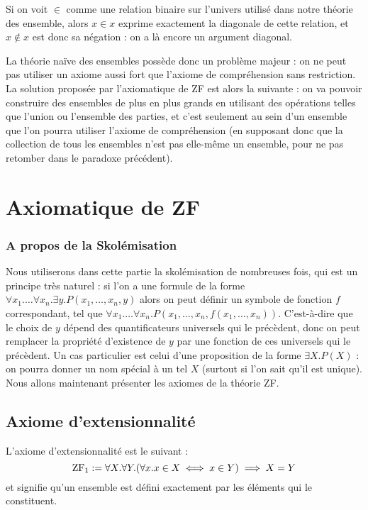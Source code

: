 \begin{rmk}
    Si on voit $\in$ comme une relation binaire sur l'univers utilisé dans notre théorie des ensemble, alors $x\in x$ exprime exactement la diagonale de cette relation, et $x\notin x$ est donc sa négation : on a là encore un argument diagonal.
\end{rmk}

La théorie naïve des ensembles possède donc un problème majeur : on ne peut pas utiliser un axiome aussi fort que l'axiome de compréhension sans restriction. La solution proposée par l'axiomatique de ZF est alors la suivante : on va pouvoir construire des ensembles de plus en plus grands en utilisant des opérations telles que l'union ou l'ensemble des parties, et c'est seulement au sein d'un ensemble que l'on pourra utiliser l'axiome de compréhension (en supposant donc que la collection de tous les ensembles n'est pas elle-même un ensemble, pour ne pas retomber dans le paradoxe précédent).

\section{Axiomatique de ZF}

\subsubsection{A propos de la Skolémisation}

Nous utiliserons dans cette partie la skolémisation de nombreuses fois, qui est un principe très naturel : si l'on a une formule de la forme $\forall x_1.\ldots\forall x_n.\exists y. P(x_1,\ldots,x_n,y)$ alors on peut définir un symbole de fonction $f$ correspondant, tel que $\forall x_1.\ldots\forall x_n.P(x_1,\ldots,x_n,f(x_1,\ldots,x_n))$. C'est-à-dire que le choix de $y$ dépend des quantificateurs universels qui le précèdent, donc on peut remplacer la propriété d'existence de $y$ par une fonction de ces universels qui le précèdent. Un cas particulier est celui d'une proposition de la forme $\exists X.P(X)$ : on pourra donner un nom spécial à un tel $X$ (surtout si l'on sait qu'il est unique). Nous allons maintenant présenter les axiomes de la théorie ZF.


\subsection{Axiome d'extensionnalité}

\begin{ax}[Extensionnalité]
    L'axiome d'extensionnalité est le suivant : $$\mathrm{ZF}_1 := \forall X.\forall Y. (\forall x. x\in X\iff x\in Y)\implies X=Y$$
    et signifie qu'un ensemble est défini exactement par les éléments qui le constituent.
\end{ax}

